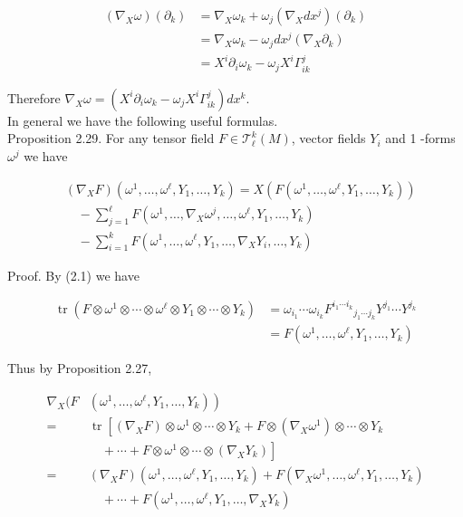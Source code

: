 \documentclass[10pt, letterpaper]{article}
\begin{document}
$$
\begin{aligned}
\left(\nabla_{X} \omega\right)\left(\partial_{k}\right) & =\nabla_{X} \omega_{k}+\omega_{j}\left(\nabla_{X} d x^{j}\right)\left(\partial_{k}\right) \\
& =\nabla_{X} \omega_{k}-\omega_{j} d x^{j}\left(\nabla_{X} \partial_{k}\right) \\
& =X^{i} \partial_{i} \omega_{k}-\omega_{j} X^{i} \Gamma_{i k}^{j}
\end{aligned}
$$

Therefore $\nabla_{X} \omega=\left(X^{i} \partial_{i} \omega_{k}-\omega_{j} X^{i} \Gamma_{i k}^{j}\right) d x^{k}$.\\
In general we have the following useful formulas.\\
Proposition 2.29. For any tensor field $F \in \mathscr{T}_{\ell}^{k}(M)$, vector fields $Y_{i}$ and 1 -forms $\omega^{j}$ we have

$$
\begin{aligned}
& \left(\nabla_{X} F\right)\left(\omega^{1}, \ldots, \omega^{\ell}, Y_{1}, \ldots, Y_{k}\right)=X\left(F\left(\omega^{1}, \ldots, \omega^{\ell}, Y_{1}, \ldots, Y_{k}\right)\right) \\
& \quad-\sum_{j=1}^{\ell} F\left(\omega^{1}, \ldots, \nabla_{X} \omega^{j}, \ldots, \omega^{\ell}, Y_{1}, \ldots, Y_{k}\right) \\
& \quad-\sum_{i=1}^{k} F\left(\omega^{1}, \ldots, \omega^{\ell}, Y_{1}, \ldots, \nabla_{X} Y_{i}, \ldots, Y_{k}\right)
\end{aligned}
$$

Proof. By (2.1) we have

$$
\begin{aligned}
\operatorname{tr}\left(F \otimes \omega^{1} \otimes \cdots \otimes \omega^{\ell} \otimes Y_{1} \otimes \cdots \otimes Y_{k}\right) & =\omega_{i_{1}} \cdots \omega_{i_{k}} F^{i_{1} \cdots i_{k}}{ }_{j_{1} \cdots j_{k}} Y^{j_{1}} \cdots Y^{j_{k}} \\
& =F\left(\omega^{1}, \ldots, \omega^{\ell}, Y_{1}, \ldots, Y_{k}\right)
\end{aligned}
$$

Thus by Proposition 2.27,

$$
\begin{aligned}
\nabla_{X}(F & \left.\left(\omega^{1}, \ldots, \omega^{\ell}, Y_{1}, \ldots, Y_{k}\right)\right) \\
= & \operatorname{tr}\left[\left(\nabla_{X} F\right) \otimes \omega^{1} \otimes \cdots \otimes Y_{k}+F \otimes\left(\nabla_{X} \omega^{1}\right) \otimes \cdots \otimes Y_{k}\right. \\
& \left.\quad+\cdots+F \otimes \omega^{1} \otimes \cdots \otimes\left(\nabla_{X} Y_{k}\right)\right] \\
= & \left(\nabla_{X} F\right)\left(\omega^{1}, \ldots, \omega^{\ell}, Y_{1}, \ldots, Y_{k}\right)+F\left(\nabla_{X} \omega^{1}, \ldots, \omega^{\ell}, Y_{1}, \ldots, Y_{k}\right) \\
& \quad+\cdots+F\left(\omega^{1}, \ldots, \omega^{\ell}, Y_{1}, \ldots, \nabla_{X} Y_{k}\right)
\end{aligned}
$$
\end{document}
